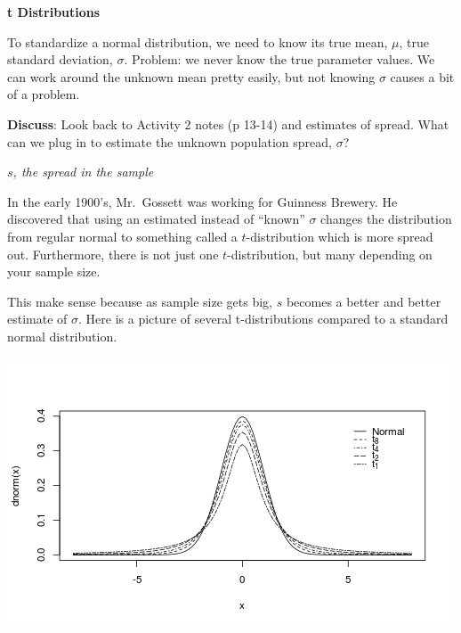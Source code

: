 \begin{center}
  {\Large\bf t Distributions}
\end{center}

To standardize a normal distribution,  we need to know its true mean,
$\mu$, true standard deviation, $\sigma$. Problem: we never know the
true parameter values.  We can work around the unknown
mean pretty easily, but not knowing $\sigma$ causes a bit of a problem.

{\bf Discuss}: Look back to Activity 2 notes (p 13-14) and estimates of spread. What can we plug in to estimate the unknown population spread,
$\sigma$? 
\begin{students}
        \vspace{2cm}        
\end{students}

\begin{key}
 {\it $s$, the spread in the sample}
\end{key}

In the early 1900's, Mr.~Gossett was working for Guinness Brewery.  He
discovered that using an estimated instead of ``known'' $\sigma$
changes the distribution from regular normal to something called a
$t$-distribution which is more spread out.  Furthermore, there is not
just one $t$-distribution, but many depending on your sample size.

This make sense because as sample size gets big, $s$ becomes a better
and better estimate of $\sigma$.  Here is a picture of several
t-distributions compared to a standard normal distribution.  

\includegraphics[width=.7\linewidth]{plots/t-normalDensities.png}

